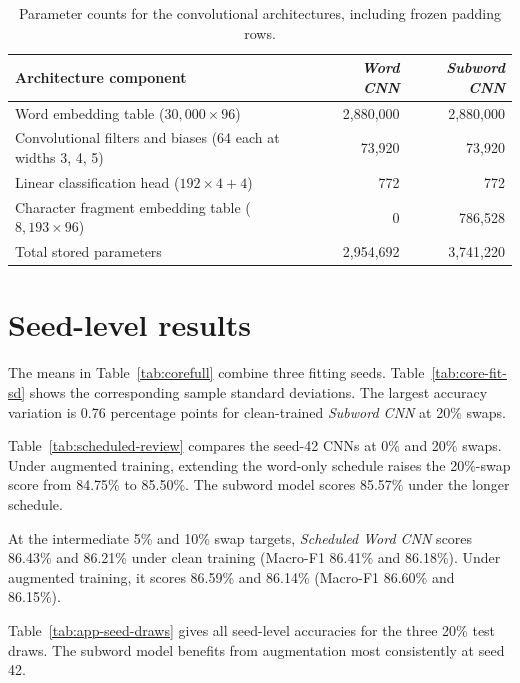 \begin{table}[H]
\centering\normalsize
\begin{tabular}{@{}lrr@{}}
\toprule
Architecture component & \textit{Word CNN} & \textit{Subword CNN} \\
\midrule
Word embedding table ($30{,}000 \times 96$) & 2,880,000 & 2,880,000 \\
Convolutional filters and biases (64 each at widths 3, 4, 5) & 73,920 & 73,920 \\
Linear classification head ($192 \times 4 + 4$) & 772 & 772 \\
Character fragment embedding table ($8{,}193 \times 96$) & 0 & 786,528 \\
\midrule
Total stored parameters & 2,954,692 & 3,741,220 \\
\bottomrule
\end{tabular}
\caption[CNN parameter breakdown]{Parameter counts for the convolutional architectures, including frozen padding rows.}
\label{tab:cnn-parameter-breakdown}
\end{table}

\Needspace{300pt}
\begingroup
\setlength{\intextsep}{7pt plus 1pt minus 1pt}
\section{Seed-level results}
The means in Table~\ref{tab:corefull} combine three fitting seeds. Table~\ref{tab:core-fit-sd} shows the corresponding sample standard deviations. The largest accuracy variation is 0.76 percentage points for clean-trained \textit{Subword CNN} at 20\% swaps.



Table~\ref{tab:scheduled-review} compares the seed-42 CNNs at 0\% and 20\% swaps. Under augmented training, extending the word-only schedule raises the 20\%-swap score from 84.75\% to 85.50\%. The subword model scores 85.57\% under the longer schedule.



At the intermediate 5\% and 10\% swap targets, \textit{Scheduled Word CNN} scores 86.43\% and 86.21\% under clean training (Macro-F1 86.41\% and 86.18\%). Under augmented training, it scores 86.59\% and 86.14\% (Macro-F1 86.60\% and 86.15\%).

Table~\ref{tab:app-seed-draws} gives all seed-level accuracies for the three 20\% test draws. The subword model benefits from augmentation most consistently at seed 42.


